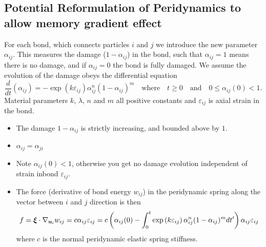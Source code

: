\documentclass{article}
\DeclareMathOperator\erf{erf}
\begin{document}
\newpage 

\subsection{Potential Reformulation of Peridynamics to allow memory gradient effect}

For each bond, which connects particles $i$ and $j$ we introduce the new parameter $\alpha_{ij}$. This measures the damage ($1 - \alpha_{ij}$)  in the bond, such that $\alpha_{ij} = 1$ means there is no damage, and if $\alpha_{ij} = 0$ the bond is fully damaged. We assume the evolution of the damage obeys the differential equation
$$
\frac{d}{dt}\left(\alpha_{ij}\right) = -\exp\left(k\varepsilon_{ij}\right)\alpha_{ij}^{n}(1-\alpha_{ij})^{m} \quad \mbox{where} \quad t \geq 0 \quad \mbox{and} \quad 0 \leq \alpha_{ij}(0) < 1 .
$$
Material parameters $k$, $\lambda$, $n$ and $m$ all positive constants and $\varepsilon_{ij}$ is axial strain in the bond.
\begin{itemize}
\item The damage $1 - \alpha_{ij}$ is strictly increasing, and bounded above by $1$.

\item $\alpha_{ij} = \alpha_{ji}$

\item Note $\alpha_{ij}(0) < 1$, otherwise you get no damage evolution independent of strain inbond $\varepsilon_{ij}$.

\item The force (derivative of bond energy $w_{ij}$) in the peridynamic spring along the vector between $i$ and $j$ direction is then
\begin{equation}\label{eqn:newsimpleBond}
f = \boldsymbol{\xi} \cdot \nabla_{{\bf u}_i}w_{ij}=  c \alpha_{ij}\varepsilon_{ij} = c \left(\alpha_{ij}(0) - \int_0^t\exp\left(k\varepsilon_{ij}\right)\alpha_{ij}^{n}(1-\alpha_{ij})^{m}dt'\right)\alpha_{ij}\varepsilon_{ij}
\end{equation}
where $c$ is the normal peridynamic elastic spring stiffness.

\end{itemize}
\end{document}
